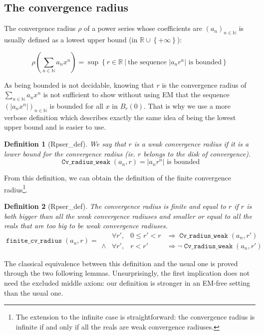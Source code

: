 \documentclass[submission,copyright]{eptcs}
\newcommand{\N}{\mathbb{N}}
\newcommand{\R}{\mathbb{R}}
\DeclareMathOperator{\cvrw}{\mathtt{Cv\_radius\_weak}}
\DeclareMathOperator{\fcvr}{\mathtt{finite\_cv\_radius}}
\newtheorem{definition}{Definition}
\begin{document}
\subsection{The convergence radius}

The convergence radius $\rho$ of a power series whose coefficients are
$(a_n)_{n \in \N}$ is usually defined as a lowest upper bound (in
$\R \cup \left\lbrace +\infty \right\rbrace$):

 $$\rho\left(\sum_{n \in \N} a_n x^n\right) = \sup \left\lbrace r \in \R ~|~
   \text{the sequence } \left|a_n r^n\right| \text{ is bounded}
   \right\rbrace$$

As being bounded is not decidable, knowing that $r$ is the convergence
radius of $\sum_{n \in \N} a_n x^n$ is not sufficient to show without
using EM that the sequence $(\left| a_n x^n \right|)_{n \in \N}$ is
bounded for all $x$ in $B_r(0)$. That is why we use a more verbose
definition which describes exactly the same idea of being the lowest upper
bound and is easier to use.

\begin{definition}[Rpser\_def] We say that $r$ is a weak convergence
radius if it is a lower bound for the convergence radius (ie. $r$ belongs
to the disk of convergence).
$$\cvrw{}(a_n,r) = \left| a_n r^n \right| \text{ is bounded}$$
\end{definition}

From this definition, we can obtain the definition of the finite
convergence radius\footnote{The extension to the infinite case is
straightforward: the convergence radius is infinite if and only if
all the reals are weak convergence radiuses.}.

\begin{definition}[Rpser\_def] The convergence radius is finite and
equal to $r$ if $r$ is both bigger than all the weak convergence radiuses 
and smaller or equal to all the reals that are too big to be weak
convergence radiuses.
$$\fcvr{}(a_n,r) =
\begin{array}{clcl}
        & \forall r', & 0 \le r' < r & \Rightarrow \cvrw{}(a_n,r') \\
 \wedge & \forall r', & r < r' & \Rightarrow \neg \cvrw{}(a_n,r')
\end{array}$$
\end{definition}

The classical equivalence between this definition and the usual one is proved
through the two following lemmas. Unsurprisingly, the first implication does
not need the excluded middle axiom: our definition is stronger in an EM-free
setting than the usual one.
\end{document}
